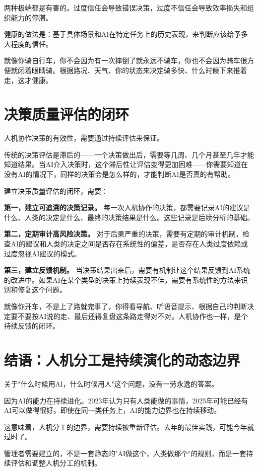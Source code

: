两种极端都是有害的。过度信任会导致错误决策，过度不信任会导致效率损失和组织能力的停滞。

健康的做法是：基于具体场景和AI在特定任务上的历史表现，来判断应该给予多大程度的信任。

就像你骑自行车，你不会因为有一次摔倒了就永远不骑车，你也不会因为骑车很方便就闭着眼睛骑。根据路况、天气、你的状态来决定骑多快、什么时候下来推着走，这才健康。

\section{决策质量评估的闭环}


人机协作决策的有效性，需要通过持续评估来保证。

传统的决策评估是滞后的——一个决策做出后，需要等几周、几个月甚至几年才能知道结果。当AI介入决策时，这个滞后性让评估变得更加困难——你需要知道在没有AI的情况下，同样的决策会是怎么样的，才能判断AI是否真的有帮助。

建立决策质量评估的闭环，需要：

\textbf{第一，建立可追溯的决策记录。} 每一次人机协作的决策，都需要记录AI的建议是什么、人类的决定是什么、最终的决策结果是什么。这些记录是后续分析的基础。

\textbf{第二，定期审计高风险决策。} 对于后果严重的决策，需要有定期的审计机制，检查AI的建议和人类的决定之间是否存在系统性的偏差，是否存在人类过度依赖或过度忽视AI建议的模式。

\textbf{第三，建立反馈机制。} 当决策结果出来后，需要有机制让这个结果反馈到AI系统的改进中。如果AI在某个类型的决策上持续表现不佳，需要有系统性的方法来识别和修复这个问题。

就像你开车，不是上了路就完事了，你得看导航、听语音提示、根据自己的判断决定要不要按AI说的走、最后还得复盘这条路走得对不对。人机协作也一样，是个持续反馈的闭环。

\section{结语：人机分工是持续演化的动态边界}


关于"什么时候用AI，什么时候用人"这个问题，没有一劳永逸的答案。

因为AI的能力在持续进化。2023年认为只有人类能做的事情，2025年可能已经有AI可以做得很好。即使在同一类任务上，AI的能力边界也在持续移动。

这意味着，人机分工的边界，需要持续被重新评估。去年的最佳实践，可能今年就过时了。

管理者需要建立的，不是一套静态的"AI做这个，人类做那个"的规则，而是一套持续评估和调整人机分工的机制。


